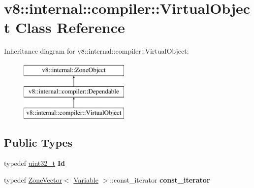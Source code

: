 \hypertarget{classv8_1_1internal_1_1compiler_1_1VirtualObject}{}\section{v8\+:\+:internal\+:\+:compiler\+:\+:Virtual\+Object Class Reference}
\label{classv8_1_1internal_1_1compiler_1_1VirtualObject}
Inheritance diagram for v8\+:\+:internal\+:\+:compiler\+:\+:Virtual\+Object\+:\begin{figure}[H]
\begin{center}
\leavevmode
\includegraphics[height=3.000000cm]{classv8_1_1internal_1_1compiler_1_1VirtualObject}
\end{center}
\end{figure}
\subsection*{Public Types}
\begin{DoxyCompactItemize}
\item 
\mbox{\label{classv8_1_1internal_1_1compiler_1_1VirtualObject_ab27d79fcafdb35ca5266d01ddda4f0ef}} 
typedef \mbox{\hyperlink{classuint32__t}{uint32\+\_\+t}} {\bfseries Id}
\item 
\mbox{\label{classv8_1_1internal_1_1compiler_1_1VirtualObject_a3f9d6466ba8ec16e97eeaf99d7bd230e}} 
typedef \mbox{\hyperlink{classv8_1_1internal_1_1ZoneVector}{Zone\+Vector}}$<$ \mbox{\hyperlink{classv8_1_1internal_1_1compiler_1_1Variable}{Variable}} $>$\+::const\+\_\+iterator {\bfseries const\+\_\+iterator}
\end{DoxyCompactItemize}
